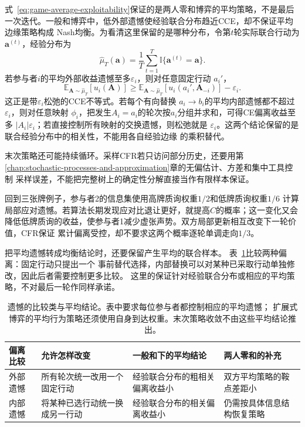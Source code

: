 式~\eqref{eq:game-average-exploitability}保证的是两人零和博弈的平均策略，不是最后
一次迭代。一般和博弈中，低外部遗憾使经验联合分布趋近CCE，却不保证平均边缘策略构成
Nash均衡。为看清这里保留的是哪种分布，令第\(t\)轮实际联合行动为
\(\bm{a}^{(t)}\)，经验分布为
\[
  \widehat{\mu}_T(\bm{a})
  =
  \frac{1}{T}
  \sum_{t=1}^{T}
  \mathbb{I}\{\bm{a}^{(t)}=\bm{a}\}.
\]
若参与者\(i\)的平均外部收益遗憾至多\(\varepsilon_i\)，则对任意固定行动
\(a_i'\)，
\[
  \mathbb{E}_{\bm{A}\sim\widehat{\mu}_T}[u_i(\bm{A})]
  \geq
  \mathbb{E}_{\bm{A}\sim\widehat{\mu}_T}
  [u_i(a_i',\bm{A}_{-i})]
  -\varepsilon_i.
\]
这正是带\(\varepsilon_i\)松弛的CCE不等式。若每个有向替换
\(a_i\to b_i\)的平均内部遗憾都不超过\(\varepsilon_i\)，则对任意映射
\(\phi_i\)，把发生\(A_i=a_i\)的轮次按\(a_i\)分组并求和，可得CE偏离收益至多
\(|A_i|\varepsilon_i\)；若直接控制所有映射的交换遗憾，则松弛就是
\(\varepsilon_i\)。这两个结论保留的是联合经验分布中的相关性，不能用各自经验边缘
的乘积替代。

末次策略还可能持续循环。采样CFR若只访问部分历史，还要用第
\ref{chap:stochastic-processes-and-approximation}章的无偏估计、方差和集中工具控制
采样误差，不能把完整树上的确定性分解直接当作有限样本保证。

回到三张牌例子，参与者2的信息集使用高牌质询权重\(1/2\)和低牌质询权重\(1/6\)
计算局部应对遗憾。若算法长期发现应对比退让更好，就提高\(C\)的概率；这一变化又会
降低低牌质询的收益，使参与者1减少虚张声势。双方局部更新相互改变下一轮价值，CFR保证
累计偏离受控，却不要求这两个概率逐轮单调走向\(1/3\)。

把平均遗憾转成均衡结论时，还要保留产生平均的联合样本。
表~\ref{tab:game-regret-comparison-conclusions}比较两种偏离：固定行动只提出一个
事前替代选择，内部替换可以对某种已采取行动单独修改，因此后者需要控制更多比较。
这里的保证针对经验联合分布或相应的平均策略，不对最后一轮作同样承诺。

\begin{table}[htbp]
  \centering
  \begin{tabularx}{\linewidth}{lXXX}
    \toprule
    偏离比较 & 允许怎样改变 & 一般和下的平均结论 & 两人零和的补充\\
    \midrule
    外部遗憾 & 所有轮次统一改用一个固定行动 & 经验联合分布的粗相关偏离收益小 & 双方平均策略的鞍点差距小\\
    内部遗憾 & 将某种已选行动统一换成另一行动 & 经验联合分布的相关偏离收益小 & 仍需按具体信息结构恢复策略\\
    \bottomrule
  \end{tabularx}
  \caption{遗憾的比较类与平均结论。表中要求每位参与者都控制相应的平均遗憾；
  扩展式博弈的平均行为策略还须使用自身到达权重。末次策略收敛不由这些平均结论推出。}
  \label{tab:game-regret-comparison-conclusions}
\end{table}

